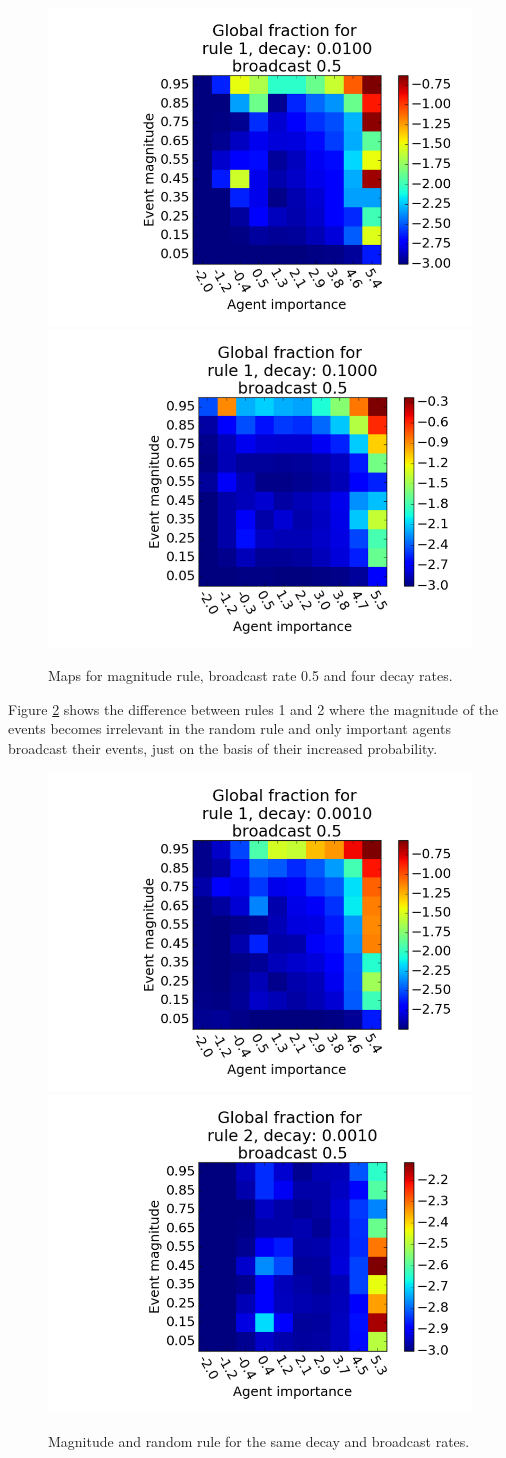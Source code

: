 \documentclass [12pt,a4paper,twoside]{article}
\begin{document}
\begin{figure}[h!]
  \centering
  \includegraphics[width=0.45\linewidth]{report/r1d01b05.png}
  \includegraphics[width=0.45\linewidth]{report/r1d1b05.png}
  \caption{Maps for magnitude rule, broadcast rate 0.5 and four decay rates.}
  \label{decay1}
\end{figure}

Figure \ref{rules} shows the difference between rules 1 and 2 where the magnitude of the events becomes irrelevant in the random rule and only important agents broadcast their events, just on the basis of their increased probability.
\begin{figure}[H]
  \centering
  \includegraphics[width=0.45\linewidth]{report/rule1.png}
  \includegraphics[width=0.45\linewidth]{report/rule2.png}  
  \caption{Magnitude and random rule for the same decay and broadcast rates.}
  \label{rules}
\end{figure}
\end{document}
